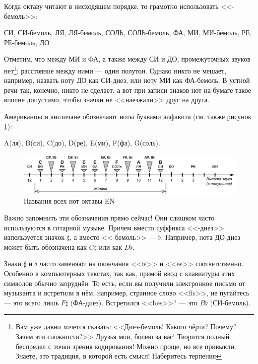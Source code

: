 Когда октаву читают в нисходящем порядке, то грамотно использовать <<-бемоль>>:
\begin{center}
    СИ, СИ-бемоль, ЛЯ, ЛЯ-бемоль, СОЛЬ, СОЛЬ-бемоль, ФА, МИ, МИ-бемоль, РЕ, РЕ-бемоль, ДО
\end{center}

Отметим, что между МИ и ФА, а также между СИ и ДО, промежуточных звуков нет\footnote{Вам уже давно хочется сказать: <<Диез-бемоль! Какого чёрта? Почему? Зачем эти сложности?>> Друзья мои, болею за вас! Творится полный беспредел с точки зрения кодирования! Можно проще, но все привыкли. Знаете, это традиция, в которой есть смысл! Наберитесь терпения}: расстояние между ними --- один полутон. Однако никто не мешает, например, назвать ноту ДО как СИ-диез, или ноту МИ как ФА-бемоль. В устной речи так, конечно, никто не сделает, а вот при записи знаков нот на бумаге такое вполне допустимо, чтобы значки не <<наезжали>> друг на друга.

Американцы и англичане обозначают ноты буквами алфавита (см. также рисунок \ref{fig:notes:names:all:EN}):
\begin{center}
    A(ля), B(си), C(до), D(ре), E(ми), F(фа), G(соль).
\end{center}

\begin{figure}[!ht]
    \centering
    \includegraphics[width=\textwidth]{fig/notes/notes-all-en} 
    \caption{Названия всех нот октавы EN}\label{fig:notes:names:all:EN}
\end{figure} 

Важно запомнить эти обозначения прямо сейчас! Они слишком часто используются в гитарной музыке. Причем вместо суффикса <<-диез>> изпользуется значок $\sharp$, а вместо <<-бемоль>> --- $\flat$. Например, нота ДО-диез может быть обозначена как $C\sharp$ или как $D\flat$.

Знаки $\sharp$ и $\flat$ часто заменяют на окончания <<is>> и <<es>> соответственно. Особенно в компьютерных текстах, так как, прямой ввод с клавиатуры этих символов обычно затруднён. То есть, если вы получили электронное письмо от музыканта и встретили в нём, например, странное слово <<fis>>, не пугайтесь --- это всего лишь $F\sharp$ (ФА-диез). Встретился <<bes>>? --- это $B\flat$ (СИ-бемоль).

